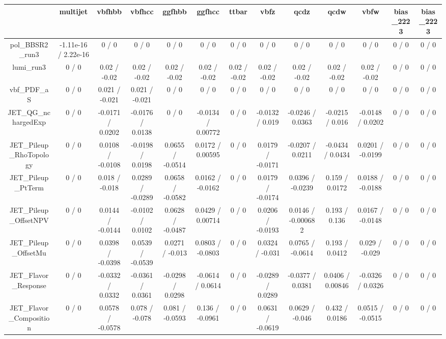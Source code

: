 \documentclass[10pt]{article}
\begin{document}
\begin{table}[htbp]
\begin{center}
\begin{tabular}{|c|c|c|c|c|c|c|c|c|c|c|c|c|}
\hline 
      & multijet      & vbfhbb      & vbfhcc      & ggfhbb      & ggfhcc      & ttbar      & vbfz      & qcdz      & qcdw      & vbfw      & bias_2223      & bias_2223 \\ 
\hline 
  pol_BBSR2_run3 & -1.11e-16 / 2.22e-16 & 0 / 0 & 0 / 0 & 0 / 0 & 0 / 0 & 0 / 0 & 0 / 0 & 0 / 0 & 0 / 0 & 0 / 0 & 0 / 0 & 0 / 0 \\ 
  lumi_run3 & 0 / 0 & 0.02 / -0.02 & 0.02 / -0.02 & 0.02 / -0.02 & 0.02 / -0.02 & 0.02 / -0.02 & 0.02 / -0.02 & 0.02 / -0.02 & 0.02 / -0.02 & 0.02 / -0.02 & 0 / 0 & 0 / 0 \\ 
  vbf_PDF_aS & 0 / 0 & 0.021 / -0.021 & 0.021 / -0.021 & 0 / 0 & 0 / 0 & 0 / 0 & 0 / 0 & 0 / 0 & 0 / 0 & 0 / 0 & 0 / 0 & 0 / 0 \\ 
  JET_QG_nchargedExp & 0 / 0 & -0.0171 / 0.0202 & -0.0176 / 0.0138 & 0 / 0 & -0.0134 / 0.00772 & 0 / 0 & -0.0132 / 0.019 & -0.0246 / 0.0363 & -0.0215 / 0.016 & -0.0148 / 0.0202 & 0 / 0 & 0 / 0 \\ 
  JET_Pileup_RhoTopology & 0 / 0 & 0.0108 / -0.0108 & -0.0198 / 0.0198 & 0.0655 / -0.0514 & 0.0172 / 0.00595 & 0 / 0 & 0.0179 / -0.0171 & -0.0207 / 0.0211 & -0.0434 / 0.0434 & 0.0201 / -0.0199 & 0 / 0 & 0 / 0 \\ 
  JET_Pileup_PtTerm & 0 / 0 & 0.018 / -0.018 & 0.0289 / -0.0289 & 0.0658 / -0.0582 & 0.0162 / -0.0162 & 0 / 0 & 0.0179 / -0.0174 & 0.0396 / -0.0239 & 0.159 / 0.0172 & 0.0188 / -0.0188 & 0 / 0 & 0 / 0 \\ 
  JET_Pileup_OffsetNPV & 0 / 0 & 0.0144 / -0.0144 & -0.0102 / 0.0102 & 0.0628 / -0.0487 & 0.0429 / 0.00714 & 0 / 0 & 0.0206 / -0.0193 & 0.0146 / -0.000682 & 0.193 / 0.136 & 0.0167 / -0.0148 & 0 / 0 & 0 / 0 \\ 
  JET_Pileup_OffsetMu & 0 / 0 & 0.0398 / -0.0398 & 0.0539 / -0.0539 & 0.0271 / -0.013 & 0.0803 / -0.0803 & 0 / 0 & 0.0324 / -0.031 & 0.0765 / -0.0614 & 0.193 / 0.0412 & 0.029 / -0.029 & 0 / 0 & 0 / 0 \\ 
  JET_Flavor_Response & 0 / 0 & -0.0332 / 0.0332 & -0.0361 / 0.0361 & -0.0298 / 0.0298 & -0.0614 / 0.0614 & 0 / 0 & -0.0289 / 0.0289 & -0.0377 / 0.0381 & 0.0406 / 0.00846 & -0.0326 / 0.0326 & 0 / 0 & 0 / 0 \\ 
  JET_Flavor_Composition & 0 / 0 & 0.0578 / -0.0578 & 0.078 / -0.078 & 0.081 / -0.0593 & 0.136 / -0.0961 & 0 / 0 & 0.0631 / -0.0619 & 0.0629 / -0.046 & 0.432 / 0.0186 & 0.0515 / -0.0515 & 0 / 0 & 0 / 0 \\ 

\end{tabular}
\end{center}
\end{table}
\end{document}
